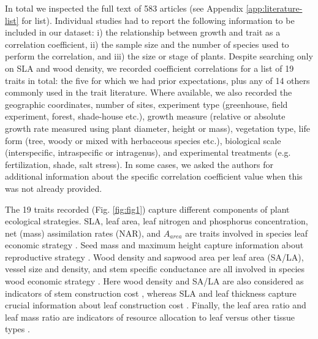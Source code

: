 \documentclass[a4paper,11pt]{article}
\begin{document}
In total we inspected the full text of 583 articles (see Appendix \ref{app:literature-list} for list). Individual studies had to report the following information to be included in our dataset: i) the relationship between growth and trait as a correlation coefficient, ii) the sample size and the number of species used to perform the correlation, and iii) the size or stage of plants. Despite searching only on SLA and wood density, we recorded coefficient correlations for a list of 19 traits in total: the five for which we had prior expectations, plus any of 14 others commonly used in the trait literature. Where available, we also recorded the geographic coordinates, number of sites, experiment type (greenhouse, field experiment, forest, shade-house etc.), growth measure (relative or absolute growth rate measured using plant diameter, height or mass), vegetation type, life form (tree, woody or mixed with herbaceous species etc.), biological scale (interspecific, intraspecific or intragenus), and experimental treatments (e.g. fertilization, shade, salt stress). In some cases, we asked the authors for additional information about the specific correlation coefficient value when this was not already provided.

The 19 traits recorded (Fig. \ref{fig:fig1}) capture different components of plant ecological strategies. SLA, leaf area, leaf nitrogen and phosphorus concentration, net (mass) assimilation rates (NAR), and $A_{area}$ are traits involved in species leaf economic strategy \citep{Wright:2004jb,Wright:2010tp}. Seed mass and maximum height capture information about reproductive strategy \citep{Falster:2005bw,Moles:2006ft}. Wood density and sapwood area per leaf area (SA/LA), vessel size and density, and stem specific conductance are all involved in species wood economic strategy  \citep{Chave:2009iy}. Here wood density and SA/LA are also considered as indicators of stem construction cost \citep{Falster:2011ii}, whereas SLA and leaf thickness capture crucial information about leaf construction cost \citep{Wright:2004jb}. Finally, the leaf area ratio and leaf mass ratio are indicators of resource allocation to leaf versus other tissue types \citep{Lambers:1992bj}.
\end{document}
